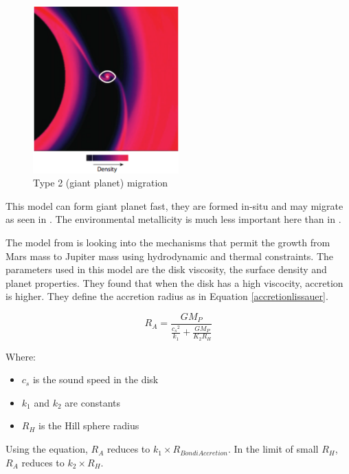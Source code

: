 \documentclass[12pt]{article} %
\begin{document}
\begin{figure}
\begin{center}
 \includegraphics[width=0.5\textwidth,keepaspectratio=true]{./images/chambers2009}
 \caption{Type 2 (giant planet) migration \cite{chambers2009planetary}}
 \label{chambers2009}
\end{center}
\end{figure}


\noindent This model can form giant planet fast, they are formed in-situ and may migrate as seen in \cite{chambers2009planetary}. The environmental metallicity is much less important here than in \cite{pollack1996formation}.\newline

\noindent The model from \cite{lissauer2009models} is looking into the mechanisms that permit the growth from Mars mass to Jupiter mass using hydrodynamic and thermal constraints. The parameters used in this model are the disk viscosity, the surface density and planet properties. They found that when the disk has a high viscocity, accretion is higher. They define the accretion radius as in Equation \ref{accretionlissauer}.\newline

\begin{equation}
R_A = \frac {GM_P} {\frac {c_s{^2}}{k_1}+\frac{GM_P}{K_2 R_H}}
\label{accretionlissauer}
\end{equation}
\smallskip

Where:
\begin{itemize}
\setlength\itemsep{0em}
\item $c_s$ is the sound speed in the disk
\item $k_1$ and $k_2$ are constants
\item $R_H$ is the Hill sphere radius
\end{itemize}
 Using the equation, $R_A$ reduces to $k_1 \times R_{Bondi Accretion}$. In the limit of small $R_H$, $R_A$ reduces to $k_2 \times R_H$.\newline
\end{document}
